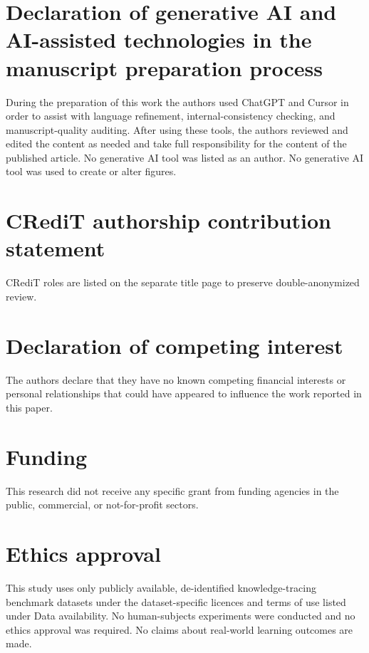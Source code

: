 \documentclass[preprint,10pt,doubleblind]{elsarticle}
\begin{document}
\section*{Declaration of generative AI and AI-assisted
technologies in the manuscript preparation process}
During the preparation of this work the authors used ChatGPT and Cursor
in order to assist with language refinement, internal-consistency
checking, and manuscript-quality auditing. After using these tools, the
authors reviewed and edited the content as needed and take full
responsibility for the content of the published article. No generative
AI tool was listed as an author. No generative AI tool was used to
create or alter figures.

\section*{CRediT authorship contribution statement}
CRediT roles are listed on the separate title page to preserve
double-anonymized review.

\section*{Declaration of competing interest}
The authors declare that they have no known competing financial
interests or personal relationships that could have appeared to
influence the work reported in this paper.

\section*{Funding}
This research did not receive any specific grant from funding agencies
in the public, commercial, or not-for-profit sectors.

\section*{Ethics approval}
This study uses only publicly available, de-identified knowledge-tracing
benchmark datasets under the dataset-specific licences and terms of use
listed under Data availability. No human-subjects experiments were
conducted and no ethics approval was required. No claims about
real-world learning outcomes are made.
\end{document}
